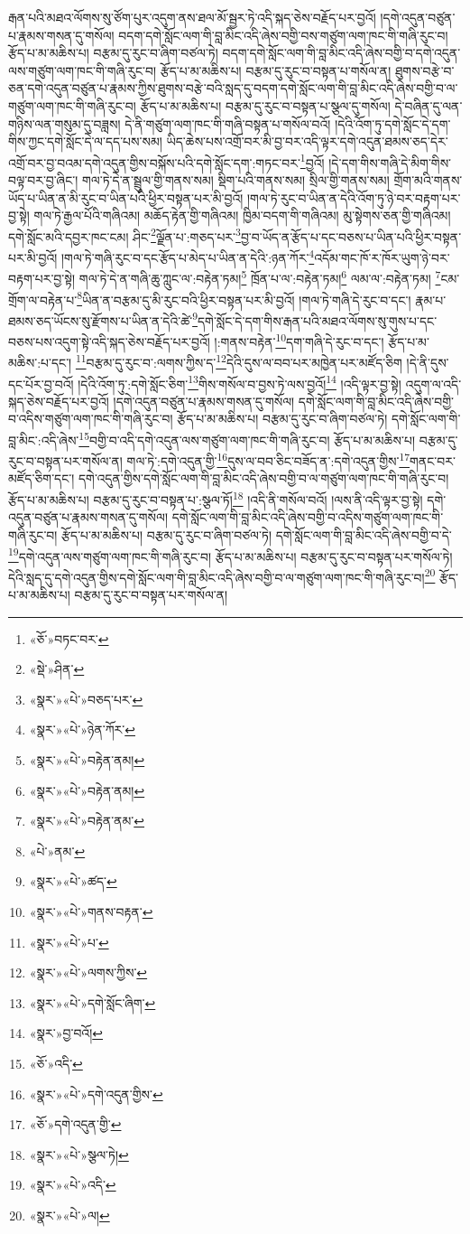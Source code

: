 རྒན་པའི་མཐའ་ལོགས་སུ་ཙོག་པུར་འདུག་ནས་ཐལ་མོ་སྦྱར་ཏེ་འདི་སྐད་ཅེས་བརྗོད་པར་བྱའོ། །དགེ་འདུན་བཙུན་པ་རྣམས་གསན་དུ་གསོལ། བདག་དགེ་སློང་ལག་གི་བླ་མིང་འདི་ཞེས་བགྱི་བས་གཙུག་ལག་ཁང་གི་གཞི་རུང་བ། རྩོད་པ་མ་མཆིས་པ། བརྩམ་དུ་རུང་བ་ཞིག་བཙལ་ཏེ། བདག་དགེ་སློང་ལག་གི་བླ་མིང་འདི་ཞེས་བགྱི་བ་དགེ་འདུན་ལས་གཙུག་ལག་ཁང་གི་གཞི་རུང་བ། རྩོད་པ་མ་མཆིས་པ། བརྩམ་དུ་རུང་བ་བསྟན་པ་གསོལ་ན། ཐུགས་བརྩེ་བ་ཅན་དགེ་འདུན་བཙུན་པ་རྣམས་ཀྱིས་ཐུགས་བརྩེ་བའི་སླད་དུ་བདག་དགེ་སློང་ལག་གི་བླ་མིང་འདི་ཞེས་བགྱི་བ་ལ་གཙུག་ལག་ཁང་གི་གཞི་རུང་བ། རྩོད་པ་མ་མཆིས་པ། བརྩམ་དུ་རུང་བ་བསྟན་པ་སྩལ་དུ་གསོལ། དེ་བཞིན་དུ་ལན་གཉིས་ལན་གསུམ་དུ་བཟླས། དེ་ནི་གཙུག་ལག་ཁང་གི་གཞི་བསྟན་པ་གསོལ་བའོ། །དེའི་འོག་ཏུ་དགེ་སློང་དེ་དག་གིས་ཀྱང་དགེ་སློང་དེ་ལ་དད་པས་སམ། ཡིད་ཆེས་པས་འགྲོ་བར་མི་བྱ་བར་འདི་ལྟར་དགེ་འདུན་ཐམས་ཅད་དེར་འགྲོ་བར་བྱ་བའམ་དགེ་འདུན་གྱིས་བསྐོས་པའི་དགེ་སློང་དག་:གཏང་བར་\footnote{«ཅོ་»བཏང་བར་}བྱའོ། །དེ་དག་གིས་གཞི་དེ་མིག་གིས་བལྟ་བར་བྱ་ཞིང་། གལ་ཏེ་དེ་ན་སྦྲུལ་གྱི་གནས་སམ། སྡིག་པའི་གནས་སམ། སྲིལ་གྱི་གནས་སམ། གྲོག་མའི་གནས་ཡོད་པ་ཡིན་ན་མི་རུང་བ་ཡིན་པའི་ཕྱིར་བསྟན་པར་མི་བྱའོ། །གལ་ཏེ་རུང་བ་ཡིན་ན་དེའི་འོག་ཏུ་ཉེ་བར་བརྟག་པར་བྱ་སྟེ། གལ་ཏེ་རྒྱལ་པོའི་གཞིའམ། མཆོད་རྟེན་གྱི་གཞིའམ། ཁྱིམ་བདག་གི་གཞིའམ། མུ་སྟེགས་ཅན་གྱི་གཞིའམ། དགེ་སློང་མའི་དབྱར་ཁང་ངམ། ཤིང་\footnote{«སྡེ་»ཤིན་}ལྗོན་པ་:གཅད་པར་\footnote{«སྣར་»«པེ་»བཅད་པར་}བྱ་བ་ཡོད་ན་རྩོད་པ་དང་བཅས་པ་ཡིན་པའི་ཕྱིར་བསྟན་པར་མི་བྱའོ། །གལ་ཏེ་གཞི་རུང་བ་དང་རྩོད་པ་མེད་པ་ཡིན་ན་དེའི་:ཉན་ཀོར་\footnote{«སྣར་»«པེ་»ཉེན་ཀོར་}འདོམ་གང་ཁོ་ར་ཁོར་ཡུག་ཉེ་བར་བརྟག་པར་བྱ་སྟེ། གལ་ཏེ་དེ་ན་གཞི་ཆུ་ཀླུང་ལ་:བརྟེན་ཏམ།\footnote{«སྣར་»«པེ་»བརྟེན་ནམ།} ཁྲོན་པ་ལ་:བརྟེན་ཏམ།\footnote{«སྣར་»«པེ་»བརྟེན་ནམ།} ལམ་ལ་:བརྟེན་ཏམ། \footnote{«སྣར་»«པེ་»བརྟེན་ནམ་}ངམ་གྲོག་ལ་བརྟེན་པ་\footnote{«པེ་»ནམ་}ཡིན་ན་བརྩམ་དུ་མི་རུང་བའི་ཕྱིར་བསྟན་པར་མི་བྱའོ། །གལ་ཏེ་གཞི་དེ་རུང་བ་དང་། རྣམ་པ་ཐམས་ཅད་ཡོངས་སུ་རྫོགས་པ་ཡིན་ན་དེའི་ཚེ་\footnote{«སྣར་»«པེ་»ཚད་}དགེ་སློང་དེ་དག་གིས་རྒན་པའི་མཐའ་ལོགས་སུ་གུས་པ་དང་བཅས་པས་འདུག་སྟེ་འདི་སྐད་ཅེས་བརྗོད་པར་བྱའོ། །:གནས་བརྟེན་\footnote{«སྣར་»«པེ་»གནས་བརྟན་}དག་གཞི་དེ་རུང་བ་དང་། རྩོད་པ་མ་མཆིས་:པ་དང་། \footnote{«སྣར་»«པེ་»པ་}བརྩམ་དུ་རུང་བ་:ལགས་ཀྱིས་ད་\footnote{«སྣར་»«པེ་»ལགས་ཀྱིས་}དེའི་དུས་ལ་བབ་པར་མཁྱེན་པར་མཛོད་ཅིག །དེ་ནི་དུས་དང་པོར་བྱ་བའོ། །དེའི་འོག་ཏུ་:དགེ་སློང་ཅིག་\footnote{«སྣར་»«པེ་»དགེ་སློང་ཞིག་}གིས་གསོལ་བ་བྱས་ཏེ་ལས་བྱའོ།\footnote{«སྣར་»བྱ་བའོ།} །འདི་ལྟར་བྱ་སྟེ། འདུག་ལ་འདི་སྐད་ཅེས་བརྗོད་པར་བྱའོ། །དགེ་འདུན་བཙུན་པ་རྣམས་གསན་དུ་གསོལ། དགེ་སློང་ལག་གི་བླ་མིང་འདི་ཞེས་བགྱི་བ་འདིས་གཙུག་ལག་ཁང་གི་གཞི་རུང་བ། རྩོད་པ་མ་མཆིས་པ། བརྩམ་དུ་རུང་བ་ཞིག་བཙལ་ཏེ། དགེ་སློང་ལག་གི་བླ་མིང་:འདི་ཞེས་\footnote{«ཅོ་»འདི་}བགྱི་བ་འདི་དགེ་འདུན་ལས་གཙུག་ལག་ཁང་གི་གཞི་རུང་བ། རྩོད་པ་མ་མཆིས་པ། བརྩམ་དུ་རུང་བ་བསྟན་པར་གསོལ་ན། གལ་ཏེ་:དགེ་འདུན་གྱི་\footnote{«སྣར་»«པེ་»དགེ་འདུན་གྱིས་}དུས་ལ་བབ་ཅིང་བཟོད་ན་:དགེ་འདུན་གྱིས་\footnote{«ཅོ་»དགེ་འདུན་གྱི་}གནང་བར་མཛོད་ཅིག་དང་། དགེ་འདུན་གྱིས་དགེ་སློང་ལག་གི་བླ་མིང་འདི་ཞེས་བགྱི་བ་ལ་གཙུག་ལག་ཁང་གི་གཞི་རུང་བ། རྩོད་པ་མ་མཆིས་པ། བརྩམ་དུ་རུང་བ་བསྟན་པ་:སྩལ་ཏོ།\footnote{«སྣར་»«པེ་»སྩལ་ཏེ།} །འདི་ནི་གསོལ་བའོ། །ལས་ནི་འདི་ལྟར་བྱ་སྟེ། དགེ་འདུན་བཙུན་པ་རྣམས་གསན་དུ་གསོལ། དགེ་སློང་ལག་གི་བླ་མིང་འདི་ཞེས་བགྱི་བ་འདིས་གཙུག་ལག་ཁང་གི་གཞི་རུང་བ། རྩོད་པ་མ་མཆིས་པ། བརྩམ་དུ་རུང་བ་ཞིག་བཙལ་ཏེ། དགེ་སློང་ལག་གི་བླ་མིང་འདི་ཞེས་བགྱི་བ་དེ་\footnote{«སྣར་»«པེ་»འདི་}དགེ་འདུན་ལས་གཙུག་ལག་ཁང་གི་གཞི་རུང་བ། རྩོད་པ་མ་མཆིས་པ། བརྩམ་དུ་རུང་བ་བསྟན་པར་གསོལ་ཏེ། དེའི་སླད་དུ་དགེ་འདུན་གྱིས་དགེ་སློང་ལག་གི་བླ་མིང་འདི་ཞེས་བགྱི་བ་ལ་གཙུག་ལག་ཁང་གི་གཞི་རུང་བ།\footnote{«སྣར་»«པེ་»ལ།} རྩོད་པ་མ་མཆིས་པ། བརྩམ་དུ་རུང་བ་བསྟན་པར་གསོལ་ན། 
